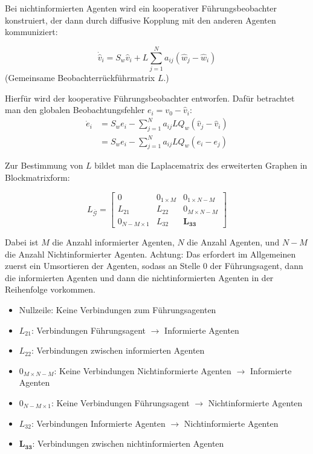 Bei nichtinformierten Agenten wird ein kooperativer Führungsbeobachter konstruiert,
der dann durch diffusive Kopplung mit den anderen Agenten kommuniziert:

\begin{equation}
    \dot{\hat{v}}_i = S_w \hat{v}_i + L \sum_{j=1}^N a_{ij} (\hat{w}_j - \hat{w}_i)
\end{equation}
(Gemeinsame Beobachterrückführmatrix $L$.)

Hierfür wird der kooperative Führungsbeobachter entworfen.
Dafür betrachtet man den globalen Beobachtungsfehler $e_i = v_0 - \hat{v}_i$:
\begin{align}
    \dot{e}_i &= S_w e_i - \sum_{j=1}^N a_{ij} L Q_w (\hat{v}_j - \hat{v}_i) \\
    &= S_w e_i - \sum_{j=1}^N a_{ij} L Q_w (e_i - e_j)
\end{align}

Zur Bestimmung von $L$ bildet man die Laplacematrix des erweiterten Graphen in Blockmatrixform:

\begin{equation}
    L_{\overbar{\mathcal{G}}} = \begin{bmatrix}
        0 & 0_{1\times M} & 0_{1 \times N-M}\\
        L_{21} & L_{22} & 0_{M \times N-M} \\
        0_{N-M \times 1} & L_{32} & \bm{L_{33}}
    \end{bmatrix}
\end{equation}

Dabei ist $M$ die Anzahl informierter Agenten, $N$ die Anzahl Agenten, und $N-M$ die
Anzahl Nichtinformierter Agenten.
Achtung: Das erfordert im Allgemeinen zuerst ein Umsortieren der Agenten, sodass
an Stelle 0 der Führungsagent, dann die informierten Agenten und dann die
nichtinformierten Agenten in der Reihenfolge vorkommen.

\begin{itemize}
    \item Nullzeile: Keine Verbindungen zum Führungsagenten
    \item $L_{21}$: Verbindungen Führungsagent $\rightarrow$ Informierte Agenten
    \item $L_{22}$: Verbindungen zwischen informierten Agenten
    \item $0_{M \times N-M}$: Keine Verbindungen Nichtinformierte Agenten $\rightarrow$ Informierte Agenten 
    \item $0_{N-M \times 1}$: Keine Verbindungen Führungsagent $\rightarrow$ Nichtinformierte Agenten
    \item $L_{32}$: Verbindungen Informierte Agenten $\rightarrow$ Nichtinformierte Agenten
    \item $\bm{L_{33}}$: Verbindungen zwischen nichtinformierten Agenten
\end{itemize}

